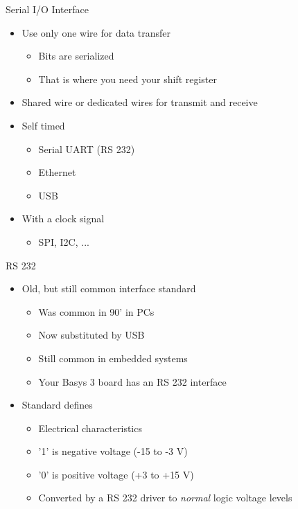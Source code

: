 \begin{frame}[fragile]{Serial I/O Interface}
\begin{itemize}
\item Use only one wire for data transfer
\begin{itemize}
\item Bits are serialized
\item That is where you need your shift register
\end{itemize}
\item Shared wire or dedicated wires for transmit and receive
\item Self timed
\begin{itemize}
\item Serial UART (RS 232)
\item Ethernet
\item USB
\end{itemize}
\item With a clock signal
\begin{itemize}
\item SPI, I2C, ...
\end{itemize}
\end{itemize}
\end{frame}



\begin{frame}[fragile]{RS 232}
\begin{itemize}
\item Old, but still common interface standard
\begin{itemize}
\item Was common in 90' in PCs
\item Now substituted by USB
\item Still common in embedded systems
\item Your Basys 3 board has an RS 232 interface
\end{itemize}
\item Standard defines
\begin{itemize}
\item Electrical characteristics
\item '1' is negative voltage (-15 to -3 V)
\item '0' is positive voltage (+3 to +15 V)
\item Converted by a RS 232 driver to \emph{normal} logic voltage levels
\end{itemize}
\end{itemize}
\end{frame}


